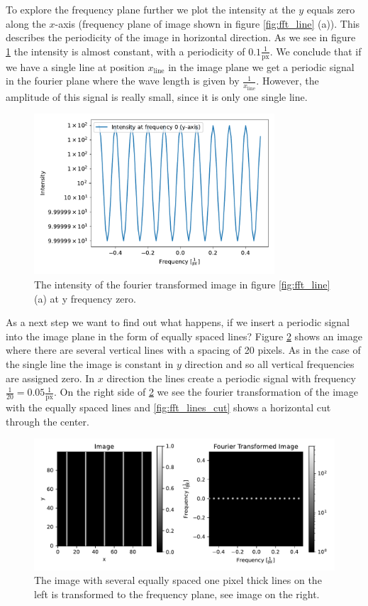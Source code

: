 To explore the frequency plane further we plot the intensity at the $y$ equals zero along the $x$-axis (frequency plane of image shown in figure \ref{fig:fft_line} (a)). This describes the periodicity of the image in horizontal direction. As we see in figure \ref{fig:fft_line_cut} the intensity is almost constant, with a periodicity of $0.1 \frac{1}{\mathrm{px}}$. We conclude that if we have a single line at position $x_{\mathrm{line}}$ in the image plane we get a periodic signal in the fourier plane where the wave length is given by $\frac{1}{x_{\mathrm{line}}}$. However, the amplitude of this signal is really small, since it is only one single line.  
\begin{figure}[H]
	\centering
		\includegraphics[width=0.8\textwidth]{pics/fft_simulation_cutoneline.pdf}
		\caption{The intensity of the fourier transformed image in figure \ref{fig:fft_line} (a) at y frequency zero.}
		\label{fig:fft_line_cut}
\end{figure}
As a next step we want to find out what happens, if we insert a periodic signal into the image plane in the form of equally spaced lines? Figure \ref{fig:fft_lines} shows an image where there are several vertical lines with a spacing of 20 pixels. As in the case of the single line the image is constant in $y$ direction and so all vertical frequencies are assigned zero. In $x$ direction the lines create a periodic signal with frequency $\frac{1}{20} = 0.05 \frac{1}{\mathrm{px}}$. On the right side of \ref{fig:fft_lines} we see the fourier transformation of the image with the equally spaced lines and \ref{fig:fft_lines_cut} shows a horizontal cut through the center. 
\begin{figure}[H]
	\centering
		\includegraphics[width=1.0\textwidth]{pics/fft_simulationmorelines.pdf}
		\caption{The image with several equally spaced one pixel thick lines on the left is transformed to the frequency plane, see image on the right.}
		\label{fig:fft_lines}
\end{figure}

